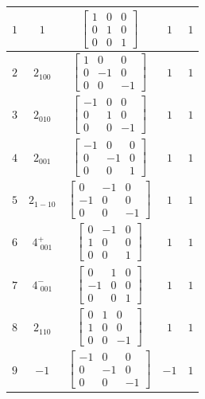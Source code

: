 \documentclass[fleqn,8pt]{jsarticle}
\begin{document}
\begin{longtable}{ccccc}
$ 1 $ & $ 1 $ & $ \begin{bmatrix} 1 & 0 & 0 \\ 0 & 1 & 0 \\ 0 & 0 & 1 \end{bmatrix} $ & $ 1 $ & $ 1 $ \\ \hline
$ 2 $ & $ 2{}_{100} $ & $ \begin{bmatrix} 1 & 0 & 0 \\ 0 & -1 & 0 \\ 0 & 0 & -1 \end{bmatrix} $ & $ 1 $ & $ 1 $ \\ \hline
$ 3 $ & $ 2{}_{010} $ & $ \begin{bmatrix} -1 & 0 & 0 \\ 0 & 1 & 0 \\ 0 & 0 & -1 \end{bmatrix} $ & $ 1 $ & $ 1 $ \\ \hline
$ 4 $ & $ 2{}_{001} $ & $ \begin{bmatrix} -1 & 0 & 0 \\ 0 & -1 & 0 \\ 0 & 0 & 1 \end{bmatrix} $ & $ 1 $ & $ 1 $ \\ \hline
$ 5 $ & $ 2{}_{1-10} $ & $ \begin{bmatrix} 0 & -1 & 0 \\ -1 & 0 & 0 \\ 0 & 0 & -1 \end{bmatrix} $ & $ 1 $ & $ 1 $ \\ \hline
$ 6 $ & $ 4^{+}_{\,\,001} $ & $ \begin{bmatrix} 0 & -1 & 0 \\ 1 & 0 & 0 \\ 0 & 0 & 1 \end{bmatrix} $ & $ 1 $ & $ 1 $ \\ \hline
$ 7 $ & $ 4^{-}_{\,\,001} $ & $ \begin{bmatrix} 0 & 1 & 0 \\ -1 & 0 & 0 \\ 0 & 0 & 1 \end{bmatrix} $ & $ 1 $ & $ 1 $ \\ \hline
$ 8 $ & $ 2{}_{110} $ & $ \begin{bmatrix} 0 & 1 & 0 \\ 1 & 0 & 0 \\ 0 & 0 & -1 \end{bmatrix} $ & $ 1 $ & $ 1 $ \\ \hline
$ 9 $ & $ -1 $ & $ \begin{bmatrix} -1 & 0 & 0 \\ 0 & -1 & 0 \\ 0 & 0 & -1 \end{bmatrix} $ & $ -1 $ & $ 1 $ \\ \hline

\end{longtable}
\end{document}
